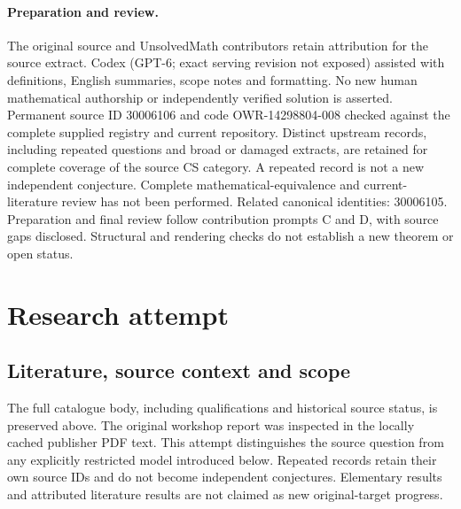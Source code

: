 \documentclass[11pt]{article}
\begin{document}
\paragraph{Preparation and review.}
The original source and UnsolvedMath contributors retain attribution for the source extract. Codex (GPT-6; exact serving revision not exposed) assisted with definitions, English summaries, scope notes and formatting. No new human mathematical authorship or independently verified solution is asserted. Permanent source ID 30006106 and code OWR-14298804-008 checked against the complete supplied registry and current repository. Distinct upstream records, including repeated questions and broad or damaged extracts, are retained for complete coverage of the source CS category. A repeated record is not a new independent conjecture. Complete mathematical-equivalence and current-literature review has not been performed. Related canonical identities: 30006105. Preparation and final review follow contribution prompts C and D, with source gaps disclosed. Structural and rendering checks do not establish a new theorem or open status.
\label{end:30006106}

\section{Research attempt}
\subsection{Literature, source context and scope}
The full catalogue body, including qualifications and historical source status, is preserved above. The original workshop report was inspected in the locally cached publisher PDF text. This attempt distinguishes the source question from any explicitly restricted model introduced below. Repeated records retain their own source IDs and do not become independent conjectures. Elementary results and attributed literature results are not claimed as new original-target progress.
\end{document}
